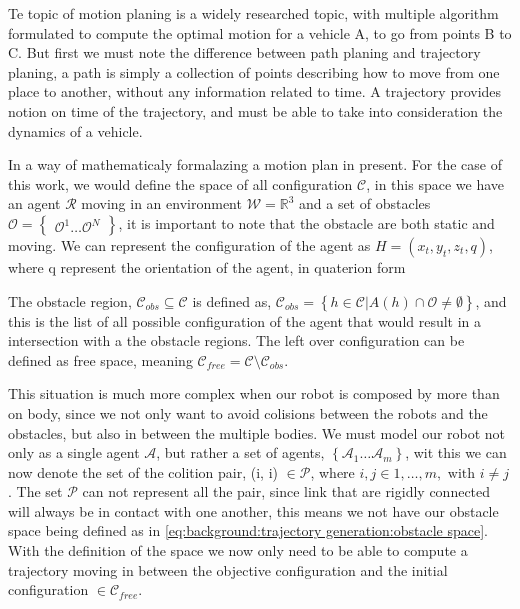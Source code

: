 Te topic of motion planing is a widely researched topic, with multiple algorithm formulated to compute the optimal motion for a vehicle A, to go from points B to C. But first we must note the difference between path planing and trajectory planing, a path is simply a collection of points describing how to move from one place to another, without any information related to time. A trajectory provides notion on time of the trajectory, and must be able to take into consideration the dynamics of a vehicle\cite{wolek2017model}.

In\cite{lavalle2006planning} a way of mathematicaly formalazing a motion plan in present. For the case of this work, we would define the space of all configuration $\mathcal{C}$, in this space we have an agent $\mathcal{R}$  moving in an environment $\mathcal{W} = \mathbb{R}^3$ and a set of obstacles $\mathcal{O} = \begin{Bmatrix} \mathcal{O}^{1} \dots \mathcal{O}^{N}\end{Bmatrix}$, it is important to note that the obstacle are both static and moving. We can represent the configuration of the agent as $H = (x_{t}, y_{t}, z_{t}, q)$,  where q represent the orientation of the agent, in quaterion form 

The obstacle region, $\mathcal{C}_{obs} \subseteq \mathcal{C}$ is defined as, $\mathcal{C}_{obs} = \left\{  h \in \mathcal{C} \vert A(h) \cap \mathcal{O} \ne \emptyset \right\}$, and this is the list of all possible configuration of the agent that would result in a intersection with a the obstacle regions. The left over configuration can be defined as free space, meaning $\mathcal{C}_{free} = \mathcal{C} \setminus \mathcal{C}_{obs}$.

This situation is much more complex when our robot is composed by more than on body, since we not only want to avoid colisions between the robots and the obstacles, but also in between the multiple bodies. We must model our robot not only as a single agent $\mathcal{A}$, but rather a set of agents, $\left\{ \mathcal{A}_1 \dots \mathcal{A}_m \right\}$, wit this we can now denote the set of the colition pair, (i, i) $\in \mathcal{P}$, where $ i, j \in {1, \dots, m}, \text{ with } i \ne j$. The set $\mathcal{P}$ can not represent all the pair, since link that are rigidly connected will always be in contact with one another, this means we not have our obstacle space being defined as in \ref{eq:background:trajectory generation:obstacle space}. With the definition of the space we now only need to be able to compute a trajectory moving in between the objective configuration and the initial configuration $\in \mathcal{C}_{free}$.

